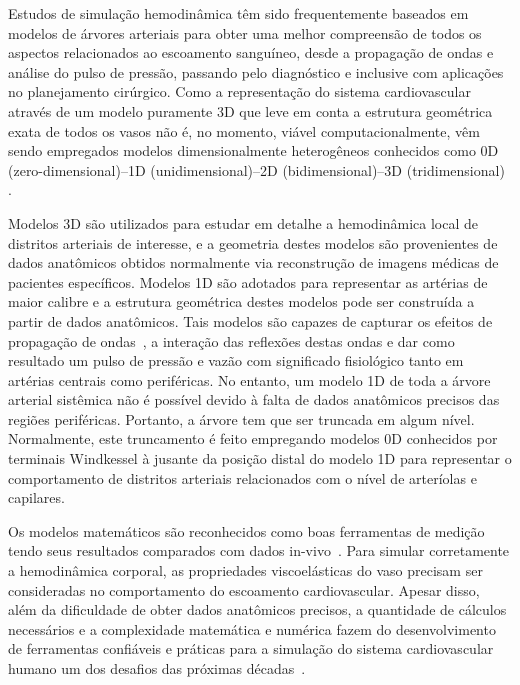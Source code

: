 \documentclass[a4paper,12pt]{monografia}
\theoremstyle{plain}
\theoremstyle{definition}
\theoremstyle{remark}
\begin{document}
Estudos de simulação hemodinâmica têm sido frequentemente baseados em modelos de árvores arteriais para obter uma melhor compreensão de todos os aspectos relacionados ao escoamento sanguíneo, desde a propagação de ondas e análise do pulso de pressão, passando pelo diagnóstico e inclusive com aplicações no planejamento cirúrgico. Como a representação do sistema cardiovascular através de um modelo puramente 3D que leve em conta a estrutura geométrica exata de todos os vasos não é, no momento, viável computacionalmente, vêm sendo empregados modelos dimensionalmente heterogêneos conhecidos como 0D (zero-dimensional)--1D (unidimensional)--2D (bidimensional)--3D (tridimensional) \cite{Formaggia2001}. 

Modelos 3D \cite{Peskin1972,Taylor1998} são utilizados para estudar em detalhe a hemodinâmica local de distritos arteriais de interesse, e a geometria destes modelos são provenientes de dados anatômicos obtidos normalmente via reconstrução de imagens médicas de pacientes específicos. Modelos 1D \cite{Avolio,Formaggia2003,Stergiopulos1992} são adotados para representar as artérias de maior calibre e a estrutura geométrica destes modelos pode ser construída a partir de dados anatômicos. Tais modelos são capazes de capturar os efeitos de propagação de ondas~\cite{Anliker1971,Duan}, a interação das reflexões destas ondas e dar como resultado um pulso de pressão e vazão com significado fisiológico tanto em artérias centrais como periféricas. No entanto, um modelo 1D de toda a árvore arterial sistêmica não é possível devido à falta de dados anatômicos precisos das regiões periféricas. Portanto, a árvore tem que ser truncada em algum nível. Normalmente, este truncamento é feito empregando modelos 0D \cite{Mates1988,Stergiopulos1992} conhecidos por terminais Windkessel à jusante da posição distal do modelo 1D para representar o comportamento de distritos arteriais relacionados com o nível de arteríolas e capilares. 

Os modelos matemáticos são reconhecidos como boas ferramentas de medição tendo seus resultados comparados com dados in-vivo~\cite{BERTAGLIA2020109595}. Para simular corretamente a hemodinâmica corporal, as propriedades viscoelásticas do vaso precisam ser consideradas no comportamento do escoamento cardiovascular. Apesar disso, além da dificuldade de obter dados anatômicos precisos, a quantidade de cálculos necessários e a complexidade matemática e numérica fazem do desenvolvimento de ferramentas confiáveis e práticas para a simulação do sistema cardiovascular humano um dos desafios das próximas décadas~\cite{QUARTERONI20043}.
\end{document}
